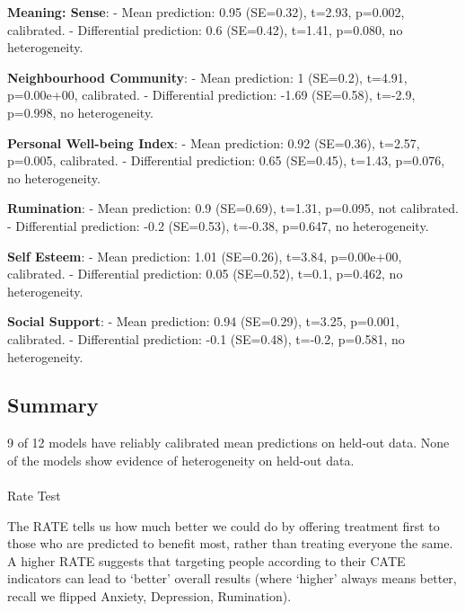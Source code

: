 \documentclass[
  single column]{article}
\makeatletter
\let\oldparagraph\paragraph
\renewcommand{\paragraph}{
    \@ifstar
      \xxxParagraphStar
      \xxxParagraphNoStar
  }
\newcommand{\xxxParagraphStar}[1]{\oldparagraph*{#1}\mbox{}}
\newcommand{\xxxParagraphNoStar}[1]{\oldparagraph{#1}\mbox{}}
\makeatother
\begin{document}
\textbf{Meaning: Sense}: - Mean prediction: 0.95 (SE=0.32), t=2.93,
p=0.002, calibrated. - Differential prediction: 0.6 (SE=0.42), t=1.41,
p=0.080, no heterogeneity.

\textbf{Neighbourhood Community}: - Mean prediction: 1 (SE=0.2), t=4.91,
p=0.00e+00, calibrated. - Differential prediction: -1.69 (SE=0.58),
t=-2.9, p=0.998, no heterogeneity.

\textbf{Personal Well-being Index}: - Mean prediction: 0.92 (SE=0.36),
t=2.57, p=0.005, calibrated. - Differential prediction: 0.65 (SE=0.45),
t=1.43, p=0.076, no heterogeneity.

\textbf{Rumination}: - Mean prediction: 0.9 (SE=0.69), t=1.31, p=0.095,
not calibrated. - Differential prediction: -0.2 (SE=0.53), t=-0.38,
p=0.647, no heterogeneity.

\textbf{Self Esteem}: - Mean prediction: 1.01 (SE=0.26), t=3.84,
p=0.00e+00, calibrated. - Differential prediction: 0.05 (SE=0.52),
t=0.1, p=0.462, no heterogeneity.

\textbf{Social Support}: - Mean prediction: 0.94 (SE=0.29), t=3.25,
p=0.001, calibrated. - Differential prediction: -0.1 (SE=0.48), t=-0.2,
p=0.581, no heterogeneity.

\subsection{Summary}\label{summary}

9 of 12 models have reliably calibrated mean predictions on held-out
data. None of the models show evidence of heterogeneity on held-out
data.

\paragraph{Rate Test}\label{rate-test}

The RATE tells us how much better we could do by offering treatment
first to those who are predicted to benefit most, rather than treating
everyone the same. A higher RATE suggests that targeting people
according to their CATE indicators can lead to `better' overall results
(where `higher' always means better, recall we flipped Anxiety,
Depression, Rumination).
\end{document}
